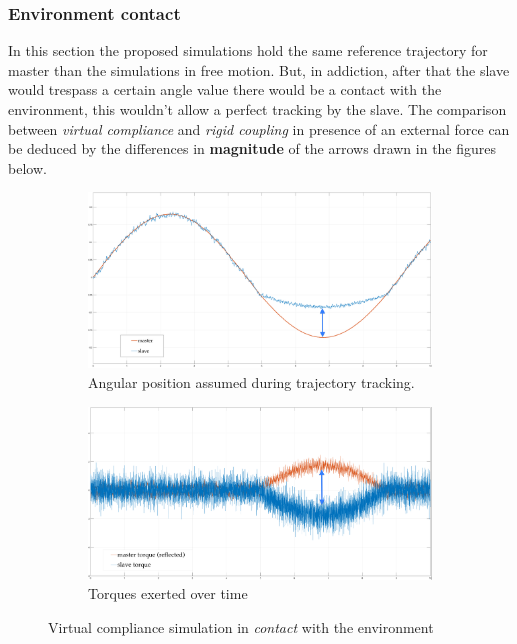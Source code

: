 \newpage
\subsubsection{Environment contact }

In this section the proposed simulations hold the same reference trajectory for
master than the simulations in free motion.
\newline
But, in addiction, after that the slave would trespass a certain angle value
there would be a contact with the environment, this wouldn't allow a perfect
tracking by the slave.
\newline
The comparison between \textsl{ virtual compliance} and \textsl{rigid coupling}
in presence of an external force can be deduced by the
differences in \textbf{magnitude} of the arrows drawn in the figures below.

\begin{figure}[h]
	\begin{subfigure}[h!]{1\linewidth}
		\centering
		\includegraphics[width=\textwidth, height=0.45\textwidth]{Images/setPointContactReacPosArrow}
		\caption{ Angular position assumed during trajectory tracking.}
		\label{fig:ContactSetPos}
	\end{subfigure}	
  \newline
	\begin{subfigure}[h!]{1\linewidth}
		\centering
		\includegraphics[width=\textwidth, height=0.45\textwidth]{Images/setPointContactReacTorArrow}
		\caption{ Torques exerted over time}
		\label{fig:ContactSetTor}
	\end{subfigure}	
 \caption{ Virtual compliance simulation in \textsl{contact} with
    the environment}
\end{figure}

